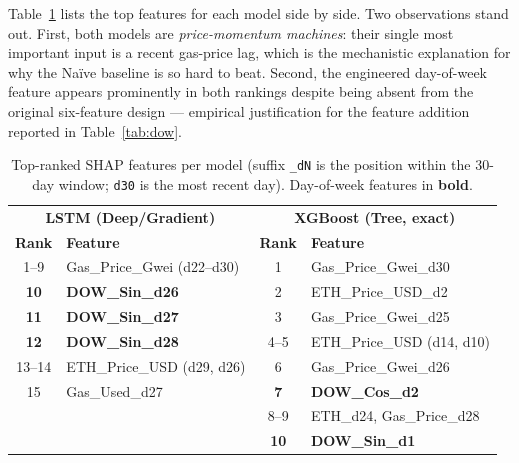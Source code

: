 \documentclass[11pt,a4paper]{article}
\begin{document}
Table~\ref{tab:shaprank} lists the top features for each model side by side. Two observations
stand out. First, both models are \emph{price-momentum machines}: their single most important
input is a recent gas-price lag, which is the mechanistic explanation for why the Na\"ive
baseline is so hard to beat. Second, the engineered day-of-week feature appears prominently in
both rankings despite being absent from the original six-feature design --- empirical
justification for the feature addition reported in Table~\ref{tab:dow}.

\begin{table}[h]
\centering
\caption{Top-ranked SHAP features per model (suffix \texttt{\_dN} is the position within the
30-day window; \texttt{d30} is the most recent day). Day-of-week features in \textbf{bold}.}
\label{tab:shaprank}
\small
\begin{tabular}{@{}clcl@{}}
\toprule
\multicolumn{2}{c}{\textbf{LSTM (Deep/Gradient)}} & \multicolumn{2}{c}{\textbf{XGBoost (Tree, exact)}} \\
\textbf{Rank} & \textbf{Feature} & \textbf{Rank} & \textbf{Feature} \\
\midrule
1--9 & Gas\_Price\_Gwei (d22--d30) & 1 & Gas\_Price\_Gwei\_d30 \\
\textbf{10} & \textbf{DOW\_Sin\_d26} & 2 & ETH\_Price\_USD\_d2 \\
\textbf{11} & \textbf{DOW\_Sin\_d27} & 3 & Gas\_Price\_Gwei\_d25 \\
\textbf{12} & \textbf{DOW\_Sin\_d28} & 4--5 & ETH\_Price\_USD (d14, d10) \\
13--14 & ETH\_Price\_USD (d29, d26) & 6 & Gas\_Price\_Gwei\_d26 \\
15 & Gas\_Used\_d27 & \textbf{7} & \textbf{DOW\_Cos\_d2} \\
 & & 8--9 & ETH\_d24, Gas\_Price\_d28 \\
 & & \textbf{10} & \textbf{DOW\_Sin\_d1} \\
\bottomrule
\end{tabular}
\end{table}
\end{document}
